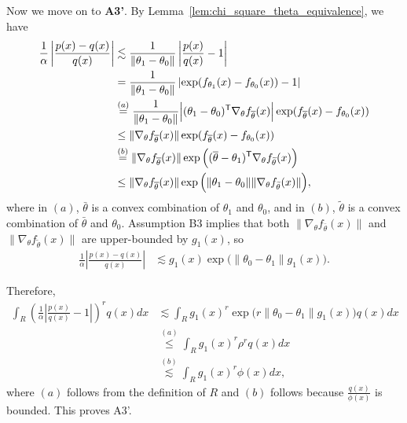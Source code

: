 \documentclass{article}
\begin{document}
Now we move on to \textbf{A3'}. By Lemma~\ref{lem:chi_square_theta_equivalence}, we have
\begin{align*}
\frac{1}{\alpha} \left| \frac{p(x) - q(x)}{q(x)} \right| &\lesssim 
    \frac{1}{\| \theta_1 - \theta_0\|}  \left| \frac{p(x)}{q(x)} - 1 \right| \\
%
 &=  \frac{1}{\| \theta_1 - \theta_0\|}  
        \left| \exp( f_{\theta_1}(x) - f_{\theta_0}(x) ) - 1 \right| \\
%
   & \stackrel{(a)} =  \frac{1}{\| \theta_1 - \theta_0\|} \Big|(\theta_1 - \theta_0)^\tran \nabla_{\theta} f_{\bar{\theta}}(x)  \Big|
      \exp( f_{\bar{\theta}}(x) - f_{\theta_0}(x)) \\
  &\leq \| \nabla_{\theta} f_{\bar{\theta}}(x) \|   \exp( f_{\bar{\theta}}(x) - f_{\theta_0}(x)) \\
%
  &\stackrel{(b)} = \|  \nabla_{\theta} f_{\bar{\theta}}(x) \| 
       \exp\Big( (\bar{\theta} - \theta_1)^\tran \nabla_{\theta} f_{\tilde{\theta}}(x) \Big) \\
  &\leq  \|  \nabla_{\theta} f_{\bar{\theta}}(x) \| 
        \exp\Big( \| \theta_1 - \theta_0\| \| \nabla_{\theta} f_{\tilde{\theta}}(x) \| \Big),
\end{align*}
where in $(a)$, $\bar{\theta}$ is a convex combination of $\theta_1$ and $\theta_0$, and in $(b)$, $\tilde{\theta}$ is a convex combination of $\bar{\theta}$ and $\theta_0$. Assumption B3 implies that both $\| \nabla_\theta f_{\bar{\theta}}(x) \|$ and 
$\| \nabla_\theta f_{\tilde{\theta}}(x) \|$ are upper-bounded by $g_1(x)$, so
\begin{align}
\frac{1}{\alpha} \left| \frac{p(x) - q(x)}{q(x)} \right| &\lesssim
         g_1(x) \exp\big( \| \theta_0 - \theta_1 \| g_1(x) \big). \label{eqn:gamma_bound_function}
\end{align}

Therefore,
\begin{align*}
\int_R \left( \frac{1}{\alpha} \left| \frac{p(x)}{q(x)} - 1 \right| \right)^r q(x) dx &\lesssim 
    \int_R  g_1(x)^r \exp\big(r \| \theta_0 - \theta_1 \| g_1(x) \big)  q(x) dx \\
  &\stackrel{(a)} \leq \int_R g_1(x)^r \rho^r q(x) dx \\
  &\stackrel{(b)} \lesssim \int_R g_1(x)^r \phi(x) dx,
\end{align*}
where $(a)$ follows from the definition of $R$ and $(b)$ follows because $\frac{q(x)}{\phi(x)}$ is bounded. This proves A3'. 
\end{document}
